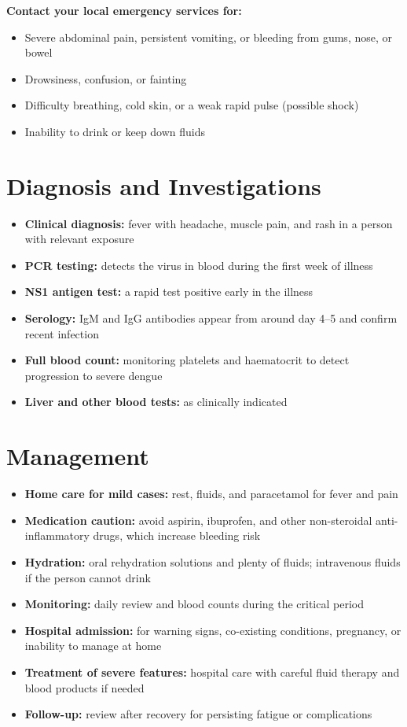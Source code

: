 \textbf{Contact your local emergency services for:}
\begin{itemize}
    \item Severe abdominal pain, persistent vomiting, or bleeding from gums, nose, or bowel
    \item Drowsiness, confusion, or fainting
    \item Difficulty breathing, cold skin, or a weak rapid pulse (possible shock)
    \item Inability to drink or keep down fluids
\end{itemize}

\section*{Diagnosis and Investigations}
\begin{itemize}
    \item \textbf{Clinical diagnosis:} fever with headache, muscle pain, and rash in a person with relevant exposure
    \item \textbf{PCR testing:} detects the virus in blood during the first week of illness
    \item \textbf{NS1 antigen test:} a rapid test positive early in the illness
    \item \textbf{Serology:} IgM and IgG antibodies appear from around day 4--5 and confirm recent infection
    \item \textbf{Full blood count:} monitoring platelets and haematocrit to detect progression to severe dengue
    \item \textbf{Liver and other blood tests:} as clinically indicated
\end{itemize}

\section*{Management}
\begin{itemize}
    \item \textbf{Home care for mild cases:} rest, fluids, and paracetamol for fever and pain
    \item \textbf{Medication caution:} avoid aspirin, ibuprofen, and other non-steroidal anti-inflammatory drugs, which increase bleeding risk
    \item \textbf{Hydration:} oral rehydration solutions and plenty of fluids; intravenous fluids if the person cannot drink
    \item \textbf{Monitoring:} daily review and blood counts during the critical period
    \item \textbf{Hospital admission:} for warning signs, co-existing conditions, pregnancy, or inability to manage at home
    \item \textbf{Treatment of severe features:} hospital care with careful fluid therapy and blood products if needed
    \item \textbf{Follow-up:} review after recovery for persisting fatigue or complications
\end{itemize}

